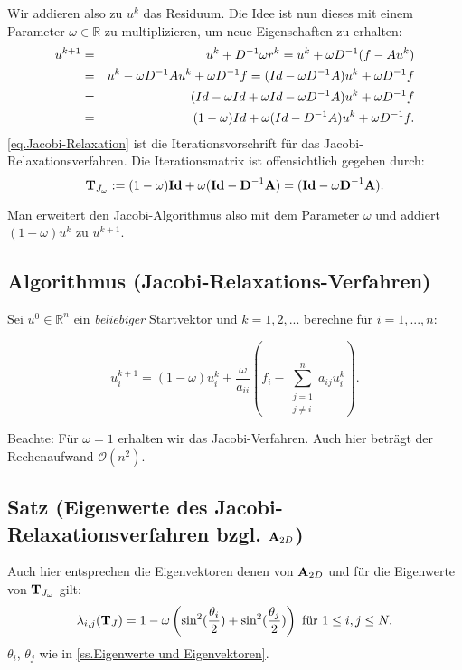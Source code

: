 Wir addieren also zu $u^{k}$ das Residuum. Die Idee ist nun dieses mit einem Parameter $\omega \in \mathbb{R}$ zu multiplizieren, um neue Eigenschaften zu erhalten:
\begin{eqnarray}
u^{k+1} &=& u^{k} + D^{-1} \omega r^{k} = u^{k} + \omega D^{-1} (f - Au^{k}) \notag \\
&=& u^{k} - \omega D^{-1} Au^{k} + \omega D^{-1}f = (Id - \omega D^{-1} A)u^{k} + \omega D^{-1}f \notag \\
&=& (Id - \omega Id + \omega Id - \omega D^{-1} A)u^{k} + \omega D^{-1}f \notag \\
&=& (1 - \omega)Id + \omega(Id - D^{-1}A) u^{k} + \omega D^{-1}f.\label{eq.Jacobi-Relaxation}
\end{eqnarray}
\autoref{eq.Jacobi-Relaxation} ist die Iterationsvorschrift für das Jacobi-Relaxationsverfahren. Die Iterationsmatrix ist offensichtlich gegeben durch:
\begin{equation}
{\textbf{T}}_{J_{\omega}} := (1 - \omega) {\textbf{Id}} + \omega({\textbf{Id}} - {\textbf{D}}^{-1} {\textbf{A}}) = ({\textbf{Id}} - \omega {\textbf{D}}^{-1} {\textbf{A}}).
\end{equation}

Man erweitert den Jacobi-Algorithmus also mit dem Parameter $\omega$ und addiert $(1 - \omega)u^{k}$ zu $u^{k+1}$.

\subsection{Algorithmus (Jacobi-Relaxations-Verfahren)}\label{ss.Algorithmus Jacobi Relax}

Sei $u^{0} \in \mathbb{R}^{n}$ ein \textit{beliebiger} Startvektor und $k=1,2,...$ berechne für $i=1,...,n$:

\begin{equation}
u^{k+1}_{i} = (1 - \omega)u^{k}_{i} + \frac {\omega} {a_{ii}} (f_{i} - \sum_{\substack{j = 1 \\ j \ne i}}^{n} a_{ij}u^{k}_{i}).
\end{equation}

Beachte: Für $\omega = 1$ erhalten wir das Jacobi-Verfahren. Auch hier beträgt der Rechenaufwand $\mathcal{O}(n^{2})$.

\subsection{Satz (Eigenwerte des Jacobi-Relaxationsverfahren bzgl. ${\textbf{A}}_{2D}$)}\label{ss.EW Relax}

Auch hier entsprechen die Eigenvektoren denen von ${\textbf{A}}_{2D}$ und für die Eigenwerte von ${\textbf{T}}_{J_{\omega}}$ gilt:
\begin{equation}
\lambda_{i,j}({\textbf{T}}_{J}) = 1 - \omega \left(\sin^{2}(\frac {\theta_{i}} {2}) + \sin^{2}(\frac {\theta_{j}} {2}) \right) \textnormal{ für } 1 \le i,j \le N.\label{eq.Jacobi-Eigenwerte}
\end{equation}
$\theta_{i}$, $\theta_{j}$ wie in \autoref{ss.Eigenwerte und Eigenvektoren}.

